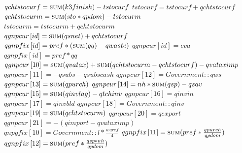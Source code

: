 \documentclass{article}
\begin{document}
\begin{algorithm}[H]
\caption{National Accounting}
    \begin{algorithmic}
            \State \(qchtstocurf = \Call{sum}{k3finish} - tstocurf\)
            \State \(tstocurf = tstocurf + qchtstocurf\)
            \State \(qchtstocurm = \Call{sum}{sto * qpdom} - tstocurm\)
            \State \(tstocurm = tstocurm + qchtstocurm\)
            \\
            \State \(qgnpcur\left[id\right] = \Call{sum}{qsnet} + qchtstocurf\) 
            \State \(qgnpfix\left[id\right] = pref * (\Call{sum}{qq} - qwaste)\)
            \EndFor
            \State \(qgnpcur\left[id\right] = cva\) 
            \State \(qgnpfix\left[id\right] = pref * qq\)
            \EndFor
            \\
            \State \(qgnpcur\left[10\right] = \Call{sum}{qvatax} + \Call{sum}{qchtstocurm - qchtstocurf} - qvataximp\) 
            \State \(qgnpcur\left[11\right] = -qsubs - qsubscash\) 
            \State \(qgnpcur\left[12\right] = Government::qws\) 
            \State \(qgnpcur\left[13\right] = \Call{sum}{qpurch}\) 
            \State \(qgnpcur\left[14\right] = nh * \Call{sum}{qsp} - qsav\) 
            \State \(qgnpcur\left[15\right] = \Call{sum}{qinvlag} - qtchinv\) 
            \State \(qgnpcur\left[16\right] = qinvin\) 
            \State \(qgnpcur\left[17\right] = qinvbld\) 
            \State \(qgnpcur\left[18\right] = Government::qinv\) 
            \State \(qgnpcur\left[19\right] = \Call{sum}{qchtstocurm}\) 
            \State \(qgnpcur\left[20\right] = qexport\) 
            \State \(qgnpcur\left[21\right] = -(qimport - qvataximp)\) 
            \\
            \State \(qnpgfix\left[10\right] = Government::l * \frac{wgref}{4}\) 
            \State \(qgnpfix\left[11\right] = \Call{sum}{pref * \frac{qpurch}{qpdom}}\) 
            \State \(qgnpfix\left[12\right] = \Call{sum}{pref * \frac{qsp * nh}{qpdom}}\) 

\end{algorithmic}
\end{algorithm}
\end{document}
